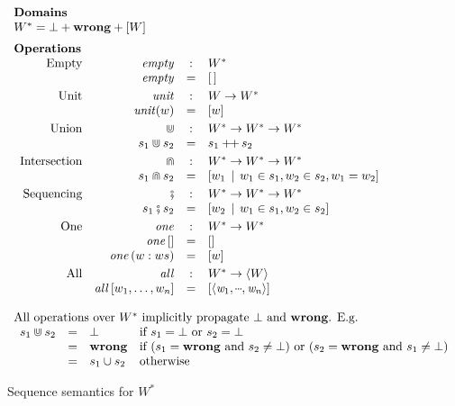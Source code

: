\documentclass[acmsmall,review,dvipsnames]{acmart}
\newcommand{\Varid}[1]{\mathit{#1}}
\newcommand\mydots{\makebox[0.55em][c]{\text{$\cdot\hspace{-0.3em}\cdot\hspace{-0.3em}\cdot$}}}
\newcommand{\vb}{\; \ensuremath{\mathop{\mid}} \;}    %
\newcommand{\tuple}[1]{\langle #1 \rangle}
\newcommand{\Value}{W}
\newcommand{\append}{+\!\!+\,}
\newcommand{\mtype}{\Value^{*}}
\newcommand{\mempty}{\mathit{empty}}
\newcommand{\munit}{\mathit{unit}}
\newcommand{\mintersect}{\Cap}
\newcommand{\munion}{\Cup}
\newcommand{\msemi}{\fatsemi}
\newcommand{\mone}{\mathit{one}}
\newcommand{\mall}{\mathit{all}}
\newcommand{\msucceeds}{\mathit{succeeds}}
\newcommand{\mdecides}{\mathit{decides}}
\newcommand{\wrong}{\mathbf{wrong}}
\begin{document}
\begin{figure}
$$
\begin{array}{l}
\text{\bf Domains} \\
\mtype  =  \bot + \wrong + [W] \\[2mm]
\text{\bf Operations} \\
\begin{array}{rrcll}
\text{Empty}        & \mempty & : &  \mtype \\
                    & \mempty & = & [ \, ] \\[1mm]
\text{Unit}    & \munit & : & \Value \rightarrow \mtype \\
               & \munit(w) & = & [ w ] \\[1mm]
\text{Union}   & \munion & : & \mtype \rightarrow \mtype \rightarrow \mtype \\
               &  s_1 \munion s_2 & = & s_1 \append s_2 \\[1mm]
\text{Intersection} & \mintersect & : & \mtype \rightarrow \mtype \rightarrow \mtype \\
                    &  s_1 \mintersect s_2 & = & [ w_1 \vb w_1 \in s_1, w_2 \in s_2, w_1 = w_2] \\[1mm]
\text{Sequencing}   & \msemi & : & \mtype \rightarrow \mtype \rightarrow \mtype \\
                    &  s_1 \msemi s_2 & = & [ w_2 \vb w_1 \in s_1, w_2 \in s_2 ] \\[1mm]
\text{One}          &   \mone  & : & \mtype \rightarrow \mtype \\
  & \mone\,[] & = & [] \\
  & \mone\,(w:ws) & = & [w] \\[1mm]
\text{All}          &   \mall  & : & \mtype \rightarrow \tuple{\Value} \\
  & \mall\,[w_1,\ldots,w_n] & = & [\ensuremath{\langle{}\Varid{w}_{\mathrm{1}},\mydots,\Varid{w}_{\Varid{n}}\rangle}] \\
\end{array} \\ \\
\text{All operations over $\mtype$ implicitly propagate $\bot$ and $\wrong$.  E.g.}\\
  \begin{array}{rcll}
    s_1 \munion s_2 & = & \bot & \text{if $s_1=\bot$ or $s_2=\bot$} \\
                    & = & \wrong & \text{if $(s_1=\wrong$ and $s_2 \neq \bot)$ or
                    $(s_2=\wrong$ and $s_1 \neq \bot)$} \\
                    & = & s_1 \cup s_2 & \text{otherwise}
  \end{array}
\end{array}
$$
\caption{Sequence semantics for $\mtype$}
\label{fig:seq-sem}
\end{figure}
\end{document}
